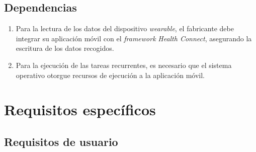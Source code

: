     \subsection{Dependencias}
        \begin{enumerate}[label=\textbf{DEP-\arabic*}]
            \item Para la lectura de los datos del dispositivo \textit{wearable}, el fabricante debe integrar su aplicación móvil con el \textit{framework} \textit{Health Connect}, asegurando la escritura de los datos recogidos.
            \item Para la ejecución de las tareas recurrentes, es necesario que el sistema operativo otorgue recursos de ejecución a la aplicación móvil.
        \end{enumerate}

\section{Requisitos específicos}

    \subsection{Requisitos de usuario}

